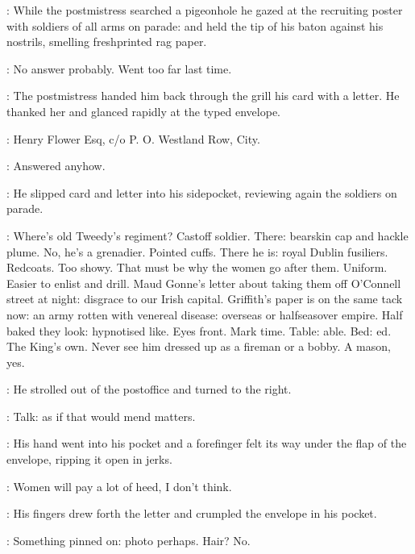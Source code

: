 :
While the postmistress searched a pigeonhole
he gazed at the recruiting poster with soldiers of all arms on parade:
and held the tip of his baton against his nostrils,
smelling freshprinted rag paper.

\BloomInt:
No answer probably.
Went too far last time.

:
The postmistress handed him back through the grill
his card with a letter.
He thanked her and glanced rapidly at the typed envelope.

:
Henry Flower Esq,
c/o P. O. Westland Row,
City.

\BloomInt:
Answered anyhow.

:
He slipped card and letter into his sidepocket,
reviewing again the soldiers on parade.

\BloomInt:
Where's old Tweedy's regiment?
Castoff soldier.
There: bearskin cap and hackle plume.
No, he's a grenadier.
Pointed cuffs.
There he is: royal Dublin fusiliers.
Redcoats.
Too showy.
That must be why the women go after them.
Uniform.
Easier to enlist and drill.
Maud Gonne's letter about taking them off O'Connell street at night:
disgrace to our Irish capital.
Griffith's paper is on the same tack now:
an army rotten with venereal disease:
overseas or halfseasover empire.
Half baked they look:
hypnotised like.
Eyes front.
Mark time.
Table: able.
Bed: ed.
The King's own.
Never see him dressed up as a fireman or a bobby.
A mason, yes.

:
He strolled out of the postoffice and turned to the right.

\BloomInt:
Talk:
as if that would mend matters.

:
His hand went into his pocket
and a forefinger felt its way under the flap of the envelope,
ripping it open in jerks.

\BloomInt:
Women will pay a lot of heed, I don't think.

:
His fingers drew forth the letter
and crumpled the envelope in his pocket.

\BloomInt:
Something pinned on:
photo perhaps.
Hair?
No.
